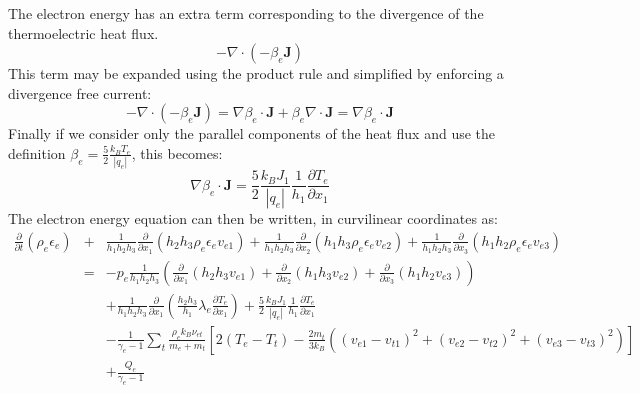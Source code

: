 \documentclass[11pt,letterpaper]{article}
\begin{document}
The electron energy has an extra term corresponding to the divergence of the thermoelectric heat flux.
\begin{equation}
- \nabla \cdot \left( - \beta_e \mathbf{J} \right)
\end{equation}
This term may be expanded using the product rule and simplified by enforcing a divergence free current:
\begin{equation}
- \nabla \cdot \left( - \beta_e \mathbf{J} \right) = \nabla \beta_e \cdot \mathbf{J} + \beta_e \nabla \cdot \mathbf{J} = \nabla \beta_e \cdot \mathbf{J}
\end{equation}
Finally if we consider only the parallel components of the heat flux and use the definition $\beta_e = \frac{5}{2} \frac{k_B T_e}{|q_e|}$, this becomes:
\begin{equation}
\nabla \beta_e \cdot \mathbf{J} = \frac{5}{2} \frac{k_B J_1}{|q_e|} \frac{1}{h_1} \frac{\partial T_e}{\partial x_1}
\end{equation}
The electron energy equation can then be written, in curvilinear coordinates as:
\begin{eqnarray}
\frac{\partial}{\partial t} \left( \rho_e \epsilon_e \right) &+& \frac{1}{h_1 h_2 h_3} \frac{\partial}{\partial x_1} \left( h_2 h_3 \rho_e \epsilon_e v_{e1} \right) + \frac{1}{h_1 h_2 h_3} \frac{\partial}{\partial x_2} \left( h_1 h_3 \rho_e \epsilon_e v_{e2} \right) + \frac{1}{h_1 h_2 h_3} \frac{\partial}{\partial x_3} \left( h_1 h_2 \rho_e \epsilon_e v_{e3} \right) \nonumber \\
&=& -p_e \frac{1}{h_1 h_2 h_3} \left( \frac{\partial}{\partial x_1} \left( h_2 h_3 v_{e1} \right) + \frac{\partial}{\partial x_2} \left( h_1 h_3 v_{e2} \right) + \frac{\partial}{\partial x_3} \left( h_1 h_2 v_{e3} \right) \right) \nonumber \\
&~& + \frac{1}{h_1 h_2 h_3} \frac{\partial}{\partial x_1} \left( \frac{h_2 h_3}{h_1} \lambda_e \frac{\partial T_e}{\partial x_1} \right) + \frac{5}{2} \frac{k_B J_1}{|q_e|} \frac{1}{h_1} \frac{\partial T_e}{\partial x_1} \nonumber \\
&~& - \frac{1}{\gamma_e - 1} \sum_t \frac{\rho_e k_B \nu_{et}}{m_e + m_t} \left[ 2 \left( T_e - T_t \right) - \frac{2 m_t}{3 k_B} \left( \left( v_{e1} - v_{t1} \right)^2 + \left( v_{e2} - v_{t2} \right)^2 + \left( v_{e3} - v_{t3} \right)^2 \right) \right] \nonumber \\
&~& + \frac{Q_e}{\gamma_e - 1} \label{eqn:electronenergycoord}
\end{eqnarray}
\end{document}
